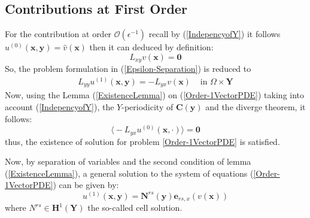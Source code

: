 \subsection{Contributions at First Order}
For the contribution at order $\mathcal{O}(\epsilon^{-1})$ recall by (\ref{IndepencyofY}) it follows $u^{(0)}(\mathbf{x},\mathbf{y}) = \hat{v}(\mathbf{x})$ then it can deduced by definition:
\begin{equation*}
    L_{xy} v(\mathbf{x}) = \mathbf{0}
\end{equation*}
So, the problem formulation in (\ref{Epsilon-Separation}) is reduced to
\begin{equation}
    \label{Order-1VectorPDE}
    \begin{array}{cc}
        L_{yy} u^{(1)}(\mathbf{x},\mathbf{y}) = - L_{yx} v(\mathbf{x}) & \text{ in } \Omega \times \mathbf{Y}
    \end{array}
\end{equation}
Now, using the Lemma (\ref{ExistenceLemma}) on (\ref{Order-1VectorPDE}) taking into account (\ref{IndepencyofY}), the $Y$-periodicity of $\mathbf{C}(\mathbf{y})$ and the diverge theorem, it follows:
\begin{equation*}
    \big\langle - L_{yx} u^{(0)}(\mathbf{x}, \cdot) \big\rangle = \mathbf{0}
\end{equation*}
thus, the existence of solution for problem \ref{Order-1VectorPDE} is satisfied.

Now, by separation of variables and the second condition of lemma (\ref{ExistenceLemma}), a general solution to the system of equations (\ref{Order-1VectorPDE}) can be given by:
\begin{equation}
    \label{Order-1Ansatz}
    u^{(1)}(\mathbf{x},\mathbf{y}) = \mathbf{N}^{rs}(\mathbf{y}) \mathbf{e}_{rs,x}(v(\mathbf{x})) 
\end{equation}
where $N^{rs} \in \mathbf{H}^1 (\mathbf{Y})$ the so-called cell solution.

